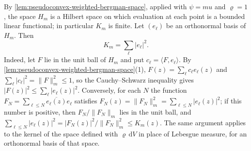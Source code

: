 By \cref{lem:pseudoconvex-weighted-bergman-space}, applied with $\psi=mu$ and $\varrho=1$, the space $H_m$ is a Hilbert space on which evaluation at each point is a bounded linear functional; in particular $K_m$ is finite. Let $(e_\ell)$ be an orthonormal basis of $H_m$. Then
\begin{equation}\label{eq:bergman-kernel-basis}
 K_m=\sum_\ell|e_\ell|^2.
\end{equation}
Indeed, let $F$ lie in the unit ball of $H_m$ and put $c_\ell=\langle F,e_\ell\rangle$. By \cref{lem:pseudoconvex-weighted-bergman-space}(1), $F(z)=\sum_\ell c_\ell e_\ell(z)$ and $\sum_\ell|c_\ell|^2=\|F\|_m^2\leq1$, so the Cauchy--Schwarz inequality gives $|F(z)|^2\leq\sum_\ell|e_\ell(z)|^2$. Conversely, for each $N$ the function $F_N=\sum_{\ell\leq N}\overline{e_\ell(z)}e_\ell$ satisfies $F_N(z)=\|F_N\|_m^2=\sum_{\ell\leq N}|e_\ell(z)|^2$; if this number is positive, then $F_N/\|F_N\|_m$ lies in the unit ball, and $\sum_{\ell\leq N}|e_\ell(z)|^2=|F_N(z)|^2/\|F_N\|_m^2\leq K_m(z)$. The same argument applies to the kernel of the space defined with $\varrho\,\mathrm dV$ in place of Lebesgue measure, for an orthonormal basis of that space.


